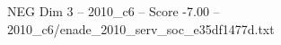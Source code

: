 \begin{textsample}{NEG Dim 3 – 2010\_c6 – Score -7.00 – 2010\_c6/enade\_2010\_serv\_soc\_e35df1477d.txt}
\end{textsample}
